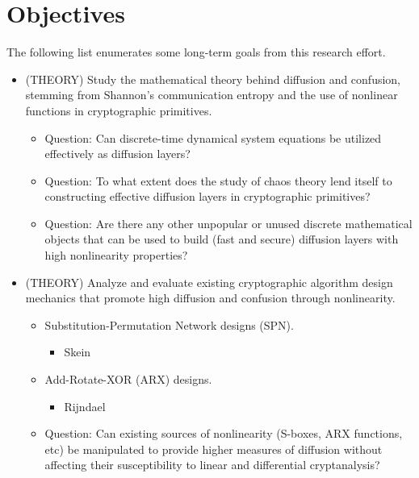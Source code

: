 \documentclass[11pt]{article}
\begin{document}


\section{Objectives}
The following list enumerates some long-term goals from this research effort.

\begin{itemize}
	\item (THEORY) Study the mathematical theory behind diffusion and confusion, stemming from Shannon's communication entropy and the use of nonlinear functions in cryptographic primitives.
	\begin{itemize}
		\item Question: Can discrete-time dynamical system equations be utilized effectively as diffusion layers? \cite{ChaosCrypto}
		\item Question: To what extent does the study of chaos theory lend itself to constructing effective diffusion layers in cryptographic primitives? \cite{ChaosCrypto}
		\item Question: Are there any other unpopular or unused discrete mathematical objects that can be used to build (fast and secure) diffusion layers with high nonlinearity properties? \cite{cryptoeprint:2010:579} \cite{cryptoeprint:2010:362} \cite{Nyberg:1991:PNS:1754868.1754910}
	\end{itemize}
	\item (THEORY) Analyze and evaluate existing cryptographic algorithm design mechanics that promote high diffusion and confusion through nonlinearity.
	\begin{itemize}
		\item Substitution-Permutation Network designs (SPN).
		\begin{itemize}
			\item Skein
		\end{itemize}
		\item Add-Rotate-XOR (ARX) designs.
		\begin{itemize}
			\item Rijndael
		\end{itemize}
		\item Question: Can existing sources of nonlinearity (S-boxes, ARX functions, etc) be manipulated to provide higher measures of diffusion without affecting their susceptibility to linear and differential cryptanalysis?

\end{itemize}
\end{itemize}
\end{document}
